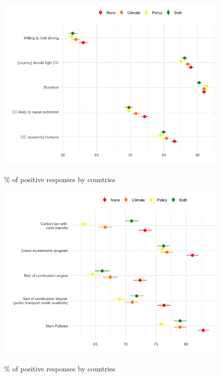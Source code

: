 \begin{frame}{}%
\begin{figure}[h!]
\caption{\% of positive responses by countries} %
\includegraphics[width=.7\paperwidth]{../figures/country_comparison/attitudes_CC_by_country.png} \\
\end{figure}
\end{frame}

\begin{frame}{}%
\begin{figure}[h!]
\caption{\% of positive responses by countries} %
\includegraphics[width=.7\paperwidth]{../figures/country_comparison/support_var_by_treatment.png} \\
\end{figure}
\end{frame}


